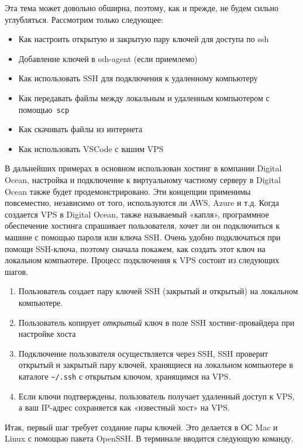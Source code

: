 \documentclass{article}
\begin{document}
Эта тема может довольно обширна, поэтому, как и прежде, не будем сильно
углубляться. Рассмотрим только следующее:

\begin{itemize}
\tightlist
\item
  Как настроить открытую и закрытую пару ключей для доступа по ssh
\item
  Добавление ключей в ssh-agent (если приемлемо)
\item
  Как использовать SSH для подключения к удаленному компьютеру
\item
  Как передавать файлы между локальным и удаленным компьютером с
  помощью\texttt{\ scp}
\item
  Как скачивать файлы из интернета
\item
  Как использовать VSCode с вашим VPS
\end{itemize}

В дальнейших примерах в основном использован хостинг в компании Digital
Ocean, настройка и подключение к виртуальному частному серверу в Digital
Ocean также будет продемонстрировано. Эти концепции применимы
повсеместно, независимо от того, используются ли AWS, Azure и т.д. Когда
создается VPS в Digital Ocean, также называемый «капля», программное
обеспечение хостинга спрашивает пользователя, хочет ли он подключиться к
машине с помощью пароля или ключа SSH. Очень удобно подключаться при
помощи SSH-ключа, поэтому сначала покажем, как создать этот ключ на
локальном компьютере. Процесс подключения к VPS состоит из следующих
шагов.

\begin{enumerate}
\tightlist
\item
  Пользователь создает пару ключей SSH (закрытый и открытый) на
  локальном компьютере.
\item
  Пользователь копирует \emph{открытый} ключ в поле SSH
  хостинг-провайдера при настройке хоста
\item
  Подключение пользователя осуществляется через SSH, SSH проверит
  открытый и закрытый пару ключей, хранящиеся на локальном компьютере в
  каталоге \texttt{\textasciitilde{}/.ssh} с открытым ключом, хранящимся
  на VPS.
\item
  Если ключи подтверждены, пользователь получает удаленный доступ к VPS,
  а ваш IP-адрес сохраняется как «известный хост» на VPS.
\end{enumerate}

Итак, первый шаг требует создание пары ключей. Это делается в ОС Mac и
Linux с помощью пакета OpenSSH. В терминале вводится следующую команду.
\end{document}
